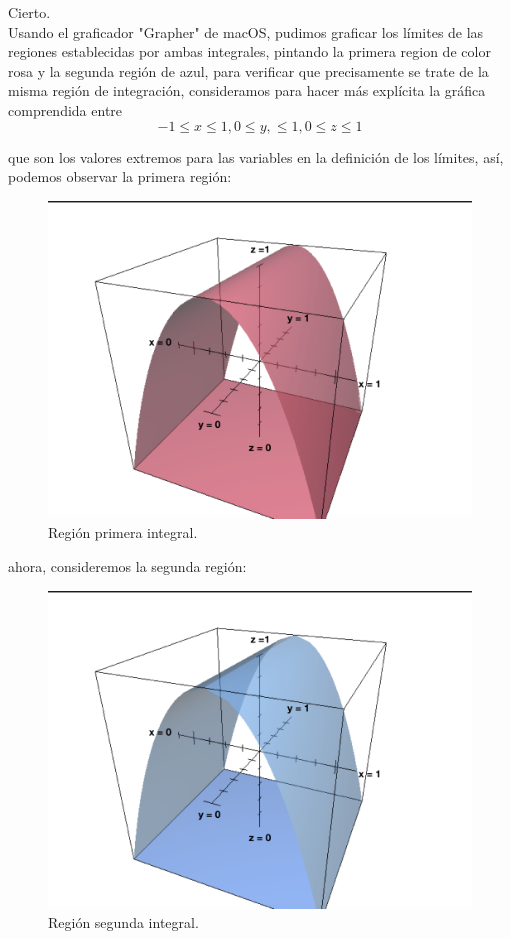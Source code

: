 \documentclass[11pt]{report}
\begin{document}
Cierto.\\
Usando el graficador "Grapher" de macOS, pudimos graficar los límites de las
regiones establecidas por ambas integrales, pintando la primera region
de color rosa y la segunda región de azul, para verificar que precisamente se
trate de la misma región de integración, consideramos para hacer más explícita
la gráfica comprendida entre
	$$ -1 \leq x \leq 1, 0 \leq y, \leq 1, 0 \leq z \leq 1 $$

que son los valores extremos para las variables en la definición de los límites,
así, podemos observar la primera región:

\begin{figure}[H]
	\includegraphics[scale=0.3]{graph1.png}
	\centering
	\caption{Región primera integral.}
	\centering
\end{figure}

ahora, consideremos la segunda región:
\begin{figure}[H]
	\includegraphics[scale=0.3]{graph2.png}
	\centering
	\caption{Región segunda integral.}
	\centering
\end{figure}
\end{document}
